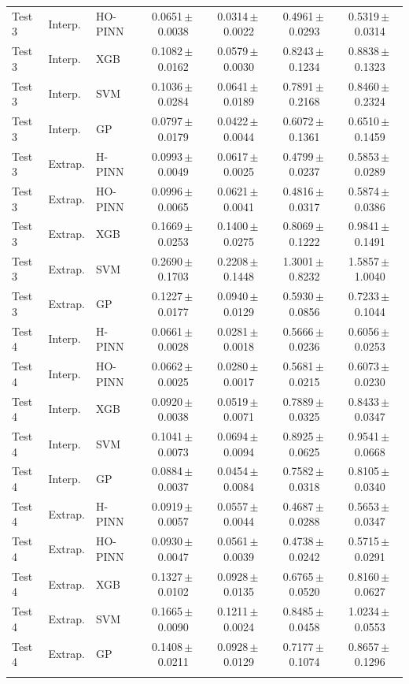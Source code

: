 \begin{longtable}{lllcccc}
Test 3 & Interp. & HO-PINN & 0.0651\,$\pm$\,0.0038 & 0.0314\,$\pm$\,0.0022 & 0.4961\,$\pm$\,0.0293 & 0.5319\,$\pm$\,0.0314 \\
Test 3 & Interp. & XGB & 0.1082\,$\pm$\,0.0162 & 0.0579\,$\pm$\,0.0030 & 0.8243\,$\pm$\,0.1234 & 0.8838\,$\pm$\,0.1323 \\
Test 3 & Interp. & SVM & 0.1036\,$\pm$\,0.0284 & 0.0641\,$\pm$\,0.0189 & 0.7891\,$\pm$\,0.2168 & 0.8460\,$\pm$\,0.2324 \\
Test 3 & Interp. & GP & 0.0797\,$\pm$\,0.0179 & 0.0422\,$\pm$\,0.0044 & 0.6072\,$\pm$\,0.1361 & 0.6510\,$\pm$\,0.1459 \\
\addlinespace[2pt]
Test 3 & Extrap. & H-PINN & 0.0993\,$\pm$\,0.0049 & 0.0617\,$\pm$\,0.0025 & 0.4799\,$\pm$\,0.0237 & 0.5853\,$\pm$\,0.0289 \\
Test 3 & Extrap. & HO-PINN & 0.0996\,$\pm$\,0.0065 & 0.0621\,$\pm$\,0.0041 & 0.4816\,$\pm$\,0.0317 & 0.5874\,$\pm$\,0.0386 \\
Test 3 & Extrap. & XGB & 0.1669\,$\pm$\,0.0253 & 0.1400\,$\pm$\,0.0275 & 0.8069\,$\pm$\,0.1222 & 0.9841\,$\pm$\,0.1491 \\
Test 3 & Extrap. & SVM & 0.2690\,$\pm$\,0.1703 & 0.2208\,$\pm$\,0.1448 & 1.3001\,$\pm$\,0.8232 & 1.5857\,$\pm$\,1.0040 \\
Test 3 & Extrap. & GP & 0.1227\,$\pm$\,0.0177 & 0.0940\,$\pm$\,0.0129 & 0.5930\,$\pm$\,0.0856 & 0.7233\,$\pm$\,0.1044 \\
\addlinespace[2pt]
Test 4 & Interp. & H-PINN & 0.0661\,$\pm$\,0.0028 & 0.0281\,$\pm$\,0.0018 & 0.5666\,$\pm$\,0.0236 & 0.6056\,$\pm$\,0.0253 \\
Test 4 & Interp. & HO-PINN & 0.0662\,$\pm$\,0.0025 & 0.0280\,$\pm$\,0.0017 & 0.5681\,$\pm$\,0.0215 & 0.6073\,$\pm$\,0.0230 \\
Test 4 & Interp. & XGB & 0.0920\,$\pm$\,0.0038 & 0.0519\,$\pm$\,0.0071 & 0.7889\,$\pm$\,0.0325 & 0.8433\,$\pm$\,0.0347 \\
Test 4 & Interp. & SVM & 0.1041\,$\pm$\,0.0073 & 0.0694\,$\pm$\,0.0094 & 0.8925\,$\pm$\,0.0625 & 0.9541\,$\pm$\,0.0668 \\
Test 4 & Interp. & GP & 0.0884\,$\pm$\,0.0037 & 0.0454\,$\pm$\,0.0084 & 0.7582\,$\pm$\,0.0318 & 0.8105\,$\pm$\,0.0340 \\
\addlinespace[2pt]
Test 4 & Extrap. & H-PINN & 0.0919\,$\pm$\,0.0057 & 0.0557\,$\pm$\,0.0044 & 0.4687\,$\pm$\,0.0288 & 0.5653\,$\pm$\,0.0347 \\
Test 4 & Extrap. & HO-PINN & 0.0930\,$\pm$\,0.0047 & 0.0561\,$\pm$\,0.0039 & 0.4738\,$\pm$\,0.0242 & 0.5715\,$\pm$\,0.0291 \\
Test 4 & Extrap. & XGB & 0.1327\,$\pm$\,0.0102 & 0.0928\,$\pm$\,0.0135 & 0.6765\,$\pm$\,0.0520 & 0.8160\,$\pm$\,0.0627 \\
Test 4 & Extrap. & SVM & 0.1665\,$\pm$\,0.0090 & 0.1211\,$\pm$\,0.0024 & 0.8485\,$\pm$\,0.0458 & 1.0234\,$\pm$\,0.0553 \\
Test 4 & Extrap. & GP & 0.1408\,$\pm$\,0.0211 & 0.0928\,$\pm$\,0.0129 & 0.7177\,$\pm$\,0.1074 & 0.8657\,$\pm$\,0.1296 \\
\addlinespace[2pt]
\end{longtable}
\endgroup
